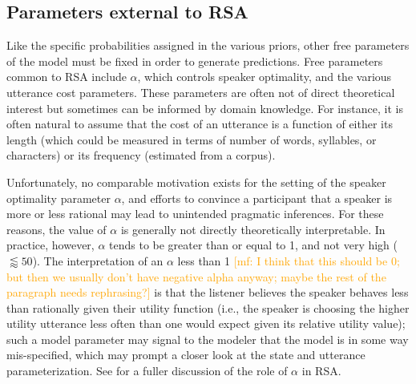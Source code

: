 \documentclass{sp}
\newcommand{\gcs}[1]{\textcolor{blue}{[gcs: #1]}}
\newcommand{\mf}[1]{\textcolor{orange}{[mf: #1]}}
\newcommand{\mht}[1]{\textcolor{purple}{[mht: #1]}}
\begin{document}


%


\subsection{Parameters external to RSA}

Like the specific probabilities assigned in the various priors, other free parameters of the model must be fixed in order to generate predictions. Free parameters common to RSA include $\alpha$, which controls speaker optimality, and the various utterance cost parameters. These parameters are often not of direct theoretical interest but sometimes can be informed by domain knowledge. For instance, it is often natural to assume that the cost of an utterance is a function of either its length  (which could be measured in terms of number of words, syllables, or characters) or its frequency (estimated from a corpus). 

Unfortunately,  no comparable motivation exists for the setting of the speaker optimality parameter $\alpha$, and efforts to convince a participant that a speaker is more or less rational may lead to unintended pragmatic inferences. For these reasons, the value of $\alpha$ is generally not directly theoretically interpretable. In practice, however, $\alpha$ tends to be greater than or equal to 1, and not very high ($\lessapprox 50$). The interpretation of an $\alpha$ less than 1 \mf{I think that this should be 0; but then we usually don't have negative alpha anyway; maybe the rest of the paragraph needs rephrasing?} is that the listener believes the speaker behaves less than rationally given their utility function (i.e., the speaker is choosing the higher utility utterance less often than one would expect given its relative utility value); such a model parameter may signal to the modeler that the model is in some way mis-specified, which may prompt a closer look at the state and utterance parameterization.  See \cite{zaslavsky2020rate} for a fuller discussion of the role of $\alpha$ in RSA.
\end{document}
